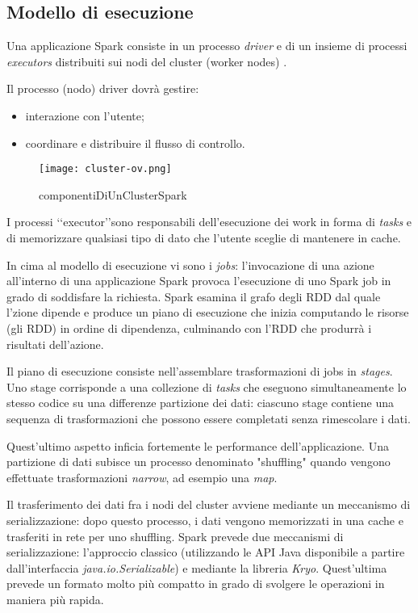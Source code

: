 \subsection{Modello di esecuzione}
Una applicazione Spark consiste in un processo \textit{driver} e di un insieme di processi \textit{executors} distribuiti sui nodi del cluster (worker nodes) .

Il processo (nodo)   driver dovrà gestire:
\begin{itemize}
\item interazione con l'utente;
\item coordinare e distribuire il flusso di controllo.
\end{itemize}


\begin{figure}[h]
\centering
\texttt{[image: cluster-ov.png]}
\caption{componentiDiUnClusterSpark}
\label{fig:sparkClusterComponents}
\end{figure} 
 
I processi \lq\lq executor\rq\rq sono responsabili dell'esecuzione dei work in forma di \textit{tasks} e di memorizzare qualsiasi tipo di dato che l'utente sceglie di mantenere in cache. 

In cima al modello di esecuzione vi sono i \textit{jobs}: l'invocazione di una azione all'interno di una applicazione Spark provoca l'esecuzione di uno Spark job in grado di soddisfare la richiesta. Spark esamina il grafo degli RDD dal quale l'zione dipende e produce un piano di esecuzione che inizia computando le risorse (gli RDD) in ordine di dipendenza, culminando con l'RDD che produrrà i risultati dell'azione.
 

Il piano di esecuzione consiste nell'assemblare trasformazioni di jobs in \textit{stages}. Uno stage corrisponde a una collezione di \textit{tasks} che eseguono simultaneamente lo stesso codice su una differenze partizione dei dati: ciascuno stage contiene una sequenza di trasformazioni che possono essere completati senza rimescolare i dati.

Quest'ultimo aspetto inficia fortemente le performance dell'applicazione. Una partizione di dati subisce un processo denominato "shuffling"  quando vengono effettuate trasformazioni \textit{narrow}, ad esempio una \textit{map}.

Il trasferimento dei dati fra i nodi del cluster avviene mediante un meccanismo di serializzazione: dopo questo processo, i dati vengono memorizzati in una cache e trasferiti in rete per uno shuffling. Spark prevede due meccanismi di serializzazione: l'approccio classico (utilizzando le API Java disponibile a partire dall'interfaccia \textit{java.io.Serializable}) e mediante la libreria \textit{Kryo}. Quest'ultima prevede un formato molto più compatto in grado di svolgere le operazioni in maniera più rapida.


